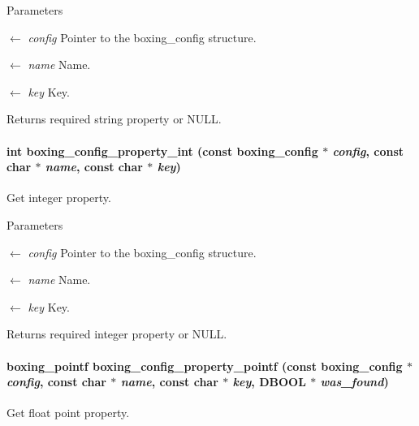 \begin{DoxyParams}{Parameters}
\item[\mbox{$\leftarrow$} {\em config}]Pointer to the boxing\_\-config structure. \item[\mbox{$\leftarrow$} {\em name}]Name. \item[\mbox{$\leftarrow$} {\em key}]Key. \end{DoxyParams}
\begin{DoxyReturn}{Returns}
required string property or NULL. 
\end{DoxyReturn}
\hypertarget{group__config_ga7fa190ebd009d28afed48273930b1365}{
\paragraph[{boxing\_\-config\_\-property\_\-int}]{\setlength{\rightskip}{0pt plus 5cm}int boxing\_\-config\_\-property\_\-int (const {\bf boxing\_\-config} $\ast$ {\em config}, \/  const char $\ast$ {\em name}, \/  const char $\ast$ {\em key})}\hfill}
\label{group__config_ga7fa190ebd009d28afed48273930b1365}
Get integer property.


\begin{DoxyParams}{Parameters}
\item[\mbox{$\leftarrow$} {\em config}]Pointer to the boxing\_\-config structure. \item[\mbox{$\leftarrow$} {\em name}]Name. \item[\mbox{$\leftarrow$} {\em key}]Key. \end{DoxyParams}
\begin{DoxyReturn}{Returns}
required integer property or NULL. 
\end{DoxyReturn}
\hypertarget{group__config_gac319e2b27a02d15a4ea05cd001d50b39}{
\paragraph[{boxing\_\-config\_\-property\_\-pointf}]{\setlength{\rightskip}{0pt plus 5cm}boxing\_\-pointf boxing\_\-config\_\-property\_\-pointf (const {\bf boxing\_\-config} $\ast$ {\em config}, \/  const char $\ast$ {\em name}, \/  const char $\ast$ {\em key}, \/  DBOOL $\ast$ {\em was\_\-found})}\hfill}
\label{group__config_gac319e2b27a02d15a4ea05cd001d50b39}
Get float point property.


